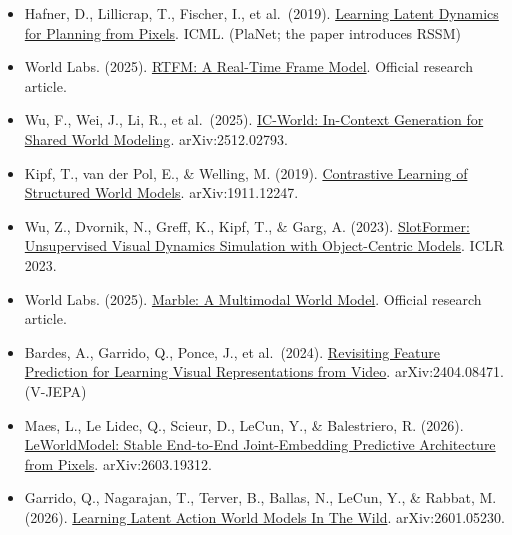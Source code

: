 \vspace{0.25em}
\begin{itemize}
\tightlist
\item
  Hafner, D., Lillicrap, T., Fischer, I., et al.~(2019). \href{https://arxiv.org/abs/1811.04551}{Learning Latent Dynamics for Planning from Pixels}. ICML. (PlaNet; the paper introduces RSSM)
\item
  World Labs. (2025). \href{https://www.worldlabs.ai/blog/rtfm}{RTFM: A Real-Time Frame Model}. Official research article.
\item
  Wu, F., Wei, J., Li, R., et al.~(2025). \href{https://arxiv.org/abs/2512.02793}{IC-World: In-Context Generation for Shared World Modeling}. arXiv:2512.02793.
\item
  Kipf, T., van der Pol, E., \& Welling, M. (2019). \href{https://arxiv.org/abs/1911.12247}{Contrastive Learning of Structured World Models}. arXiv:1911.12247.
\item
  Wu, Z., Dvornik, N., Greff, K., Kipf, T., \& Garg, A. (2023). \href{https://arxiv.org/abs/2210.05861}{SlotFormer: Unsupervised Visual Dynamics Simulation with Object-Centric Models}. ICLR 2023.
\item
  World Labs. (2025). \href{https://www.worldlabs.ai/blog/marble-world-model}{Marble: A Multimodal World Model}. Official research article.
\item
  Bardes, A., Garrido, Q., Ponce, J., et al.~(2024). \href{https://arxiv.org/abs/2404.08471}{Revisiting Feature Prediction for Learning Visual Representations from Video}. arXiv:2404.08471. (V-JEPA)
\item
  Maes, L., Le Lidec, Q., Scieur, D., LeCun, Y., \& Balestriero, R. (2026). \href{https://arxiv.org/abs/2603.19312}{LeWorldModel: Stable End-to-End Joint-Embedding Predictive Architecture from Pixels}. arXiv:2603.19312.
\item
  Garrido, Q., Nagarajan, T., Terver, B., Ballas, N., LeCun, Y., \& Rabbat, M. (2026). \href{https://arxiv.org/abs/2601.05230}{Learning Latent Action World Models In The Wild}. arXiv:2601.05230.
\end{itemize}

\clearpage
